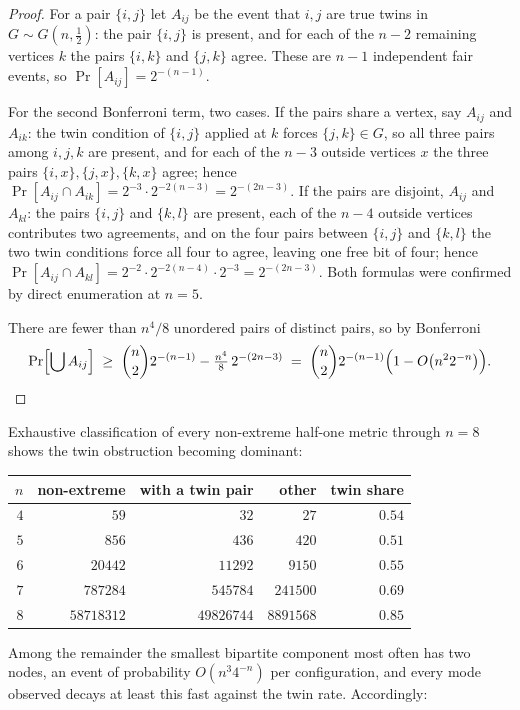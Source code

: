 \documentclass[11pt]{article}
\theoremstyle{definition}
\theoremstyle{remark}
\begin{document}
\begin{proof}
For a pair $\{i,j\}$ let $A_{ij}$ be the event that $i,j$ are true twins in
$G\sim G(n,\tfrac12)$: the pair $\{i,j\}$ is present, and for each of the $n-2$ remaining
vertices $k$ the pairs $\{i,k\}$ and $\{j,k\}$ agree. These are $n-1$ independent fair
events, so $\Pr[A_{ij}]=2^{-(n-1)}$.

For the second Bonferroni term, two cases. If the pairs share a vertex, say $A_{ij}$ and
$A_{ik}$: the twin condition of $\{i,j\}$ applied at $k$ forces $\{j,k\}\in G$, so all
three pairs among $i,j,k$ are present, and for each of the $n-3$ outside vertices $x$ the
three pairs $\{i,x\},\{j,x\},\{k,x\}$ agree; hence
$\Pr[A_{ij}\cap A_{ik}]=2^{-3}\cdot2^{-2(n-3)}=2^{-(2n-3)}$. If the pairs are disjoint,
$A_{ij}$ and $A_{kl}$: the pairs $\{i,j\}$ and $\{k,l\}$ are present, each of the $n-4$
outside vertices contributes two agreements, and on the four pairs between $\{i,j\}$ and
$\{k,l\}$ the two twin conditions force all four to agree, leaving one free bit of four;
hence $\Pr[A_{ij}\cap A_{kl}]=2^{-2}\cdot2^{-2(n-4)}\cdot2^{-3}=2^{-(2n-3)}$. Both
formulas were confirmed by direct enumeration at $n=5$.

There are fewer than $n^4/8$ unordered pairs of distinct pairs, so by Bonferroni
\[
\Pr\Bigl[\bigcup A_{ij}\Bigr]\;\geq\;\binom n2 2^{-(n-1)}-\tfrac{n^4}8\,2^{-(2n-3)}
\;=\;\binom n2 2^{-(n-1)}\Bigl(1-O\bigl(n^22^{-n}\bigr)\Bigr).\qedhere
\]
\end{proof}

Exhaustive classification of every non-extreme half-one metric through $n=8$ shows the twin
obstruction becoming dominant:

\begin{center}
\begin{tabular}{r|r|r|r|r}
$n$ & non-extreme & with a twin pair & other & twin share\\
\hline
$4$ & $59$ & $32$ & $27$ & $0.54$\\
$5$ & $856$ & $436$ & $420$ & $0.51$\\
$6$ & $20442$ & $11292$ & $9150$ & $0.55$\\
$7$ & $787284$ & $545784$ & $241500$ & $0.69$\\
$8$ & $58718312$ & $49826744$ & $8891568$ & $0.85$
\end{tabular}
\end{center}

Among the remainder the smallest bipartite component most often has two nodes, an event of
probability $O(n^3 4^{-n})$ per configuration, and every mode observed decays at least this
fast against the twin rate. Accordingly:
\end{document}
